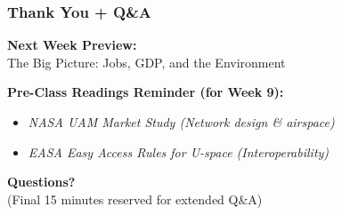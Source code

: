 \documentclass{beamer}
\begin{document}
\begin{frame}[t]
  \frametitle{Thank You + Q\&A}
  
  \begin{center}
      \textbf{Next Week Preview:} \\
      \Large The Big Picture: Jobs, GDP, and the Environment
  \end{center}
  
  \vspace{0.5cm}
  \textbf{Pre-Class Readings Reminder (for Week 9):}
  \begin{itemize}
      \item \textit{NASA UAM Market Study (Network design \& airspace)}
      \item \textit{EASA Easy Access Rules for U-space (Interoperability)}
  \end{itemize}
  
  \vspace{0.5cm}
  \begin{center}
      \textbf{Questions?} \\
      \small (Final 15 minutes reserved for extended Q\&A)
  \end{center}
\end{frame}
\end{document}

